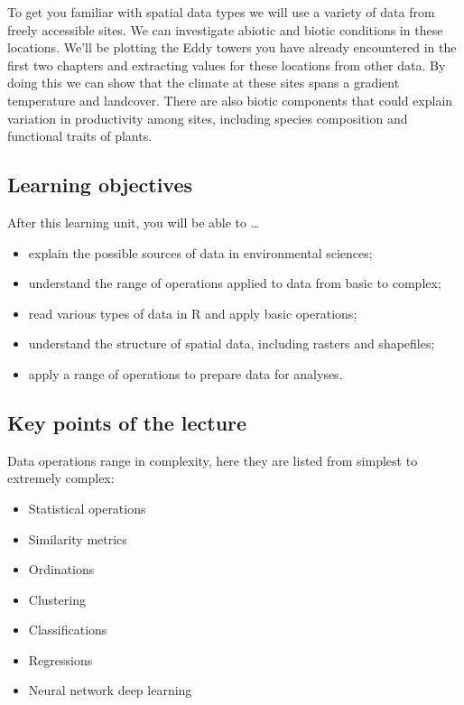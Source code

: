 \documentclass[
]{book}
\providecommand{\tightlist}{%
  \setlength{\itemsep}{0pt}\setlength{\parskip}{0pt}}
\begin{document}
To get you familiar with spatial data types we will use a variety of data from freely accessible sites. We can investigate abiotic and biotic conditions in these locations. We'll be plotting the Eddy towers you have already encountered in the first two chapters and extracting values for these locations from other data. By doing this we can show that the climate at these sites spans a gradient temperature and landcover. There are also biotic components that could explain variation in productivity among sites, including species composition and functional traits of plants.

\hypertarget{learning-objectives}{%
\subsection{Learning objectives}\label{learning-objectives}}

After this learning unit, you will be able to \ldots{}

\begin{itemize}
\tightlist
\item
  explain the possible sources of data in environmental sciences;
\item
  understand the range of operations applied to data from basic to complex;
\item
  read various types of data in R and apply basic operations;
\item
  understand the structure of spatial data, including rasters and shapefiles;
\item
  apply a range of operations to prepare data for analyses.
\end{itemize}

\hypertarget{key-points-of-the-lecture}{%
\subsection{Key points of the lecture}\label{key-points-of-the-lecture}}

Data operations range in complexity, here they are listed from simplest to extremely complex:

\begin{itemize}
\tightlist
\item
  Statistical operations
\item
  Similarity metrics
\item
  Ordinations
\item
  Clustering
\item
  Classifications
\item
  Regressions
\item
  Neural network deep learning
\end{itemize}
\end{document}
